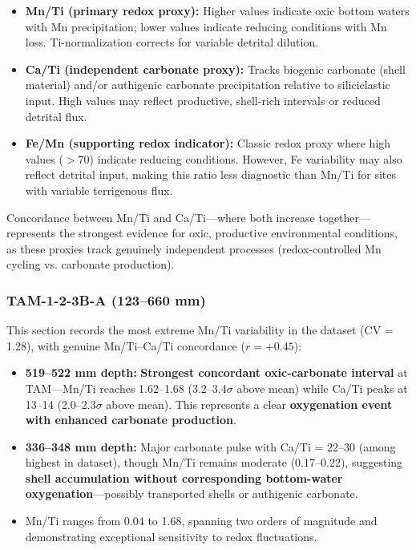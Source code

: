 \begin{itemize}
\item \textbf{Mn/Ti (primary redox proxy):} Higher values indicate oxic bottom waters with Mn precipitation; lower values indicate reducing conditions with Mn loss. Ti-normalization corrects for variable detrital dilution.

\item \textbf{Ca/Ti (independent carbonate proxy):} Tracks biogenic carbonate (shell material) and/or authigenic carbonate precipitation relative to siliciclastic input. High values may reflect productive, shell-rich intervals or reduced detrital flux.

\item \textbf{Fe/Mn (supporting redox indicator):} Classic redox proxy where high values ($>70$) indicate reducing conditions. However, Fe variability may also reflect detrital input, making this ratio less diagnostic than Mn/Ti for sites with variable terrigenous flux.
\end{itemize}

Concordance between Mn/Ti and Ca/Ti---where both increase together---represents the strongest evidence for oxic, productive environmental conditions, as these proxies track genuinely independent processes (redox-controlled Mn cycling vs. carbonate production).

\subsubsection{TAM-1-2-3B-A (123--660 mm)}

This section records the most extreme Mn/Ti variability in the dataset (CV = 1.28), with genuine Mn/Ti--Ca/Ti concordance ($r = +0.45$):

\begin{itemize}
\item \textbf{519--522 mm depth:} \textbf{Strongest concordant oxic-carbonate interval} at TAM---Mn/Ti reaches 1.62--1.68 (3.2--3.4$\sigma$ above mean) while Ca/Ti peaks at 13--14 (2.0--2.3$\sigma$ above mean). This represents a clear \textbf{oxygenation event with enhanced carbonate production}.

\item \textbf{336--348 mm depth:} Major carbonate pulse with Ca/Ti = 22--30 (among highest in dataset), though Mn/Ti remains moderate (0.17--0.22), suggesting \textbf{shell accumulation without corresponding bottom-water oxygenation}---possibly transported shells or authigenic carbonate.

\item Mn/Ti ranges from 0.04 to 1.68, spanning two orders of magnitude and demonstrating exceptional sensitivity to redox fluctuations.
\end{itemize}

